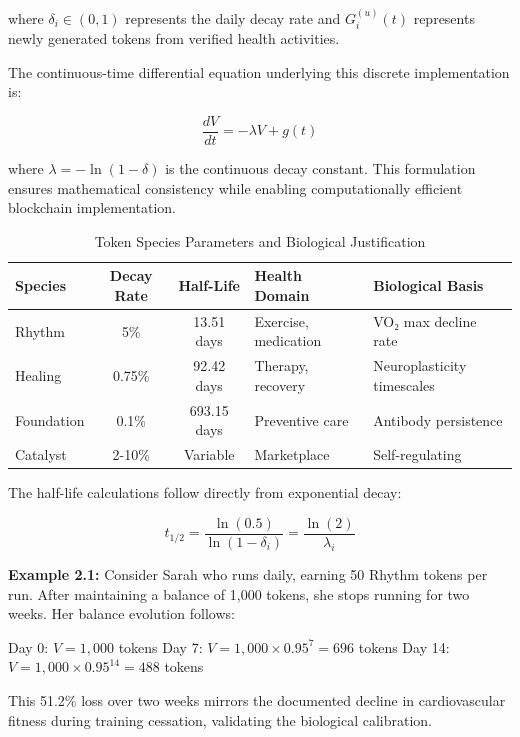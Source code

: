 \documentclass[11pt,letterpaper]{article}
\begin{document}
where $\delta_i \in (0,1)$ represents the daily decay rate and $G_i^{(u)}(t)$ represents newly generated tokens from verified health activities.

The continuous-time differential equation underlying this discrete implementation is:

\begin{equation}
\frac{dV}{dt} = -\lambda V + g(t)
\end{equation}

where $\lambda = -\ln(1-\delta)$ is the continuous decay constant. This formulation ensures mathematical consistency while enabling computationally efficient blockchain implementation.

\begin{table}[h]
\centering
\caption{Token Species Parameters and Biological Justification}
\begin{tabular}{lccll}
\toprule
\textbf{Species} & \textbf{Decay Rate} & \textbf{Half-Life} & \textbf{Health Domain} & \textbf{Biological Basis} \\
\midrule
Rhythm & 5\% & 13.51 days & Exercise, medication & VO₂ max decline rate \\
Healing & 0.75\% & 92.42 days & Therapy, recovery & Neuroplasticity timescales \\
Foundation & 0.1\% & 693.15 days & Preventive care & Antibody persistence \\
Catalyst & 2-10\% & Variable & Marketplace & Self-regulating \\
\bottomrule
\end{tabular}
\end{table}

The half-life calculations follow directly from exponential decay:

\begin{equation}
t_{1/2} = \frac{\ln(0.5)}{\ln(1 - \delta_i)} = \frac{\ln(2)}{\lambda_i}
\end{equation}

\textbf{Example 2.1:} Consider Sarah who runs daily, earning 50 Rhythm tokens per run. After maintaining a balance of 1,000 tokens, she stops running for two weeks. Her balance evolution follows:

Day 0: $V = 1,000$ tokens  
Day 7: $V = 1,000 \times 0.95^7 = 696$ tokens  
Day 14: $V = 1,000 \times 0.95^{14} = 488$ tokens

This 51.2\% loss over two weeks mirrors the documented decline in cardiovascular fitness during training cessation, validating the biological calibration.
\end{document}
